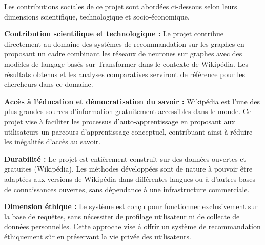 Les contributions sociales de ce projet sont abordées ci-dessous selon leurs dimensions scientifique, technologique et socio-économique.

\textbf{Contribution scientifique et technologique :}
Le projet contribue directement au domaine des systèmes de recommandation sur les graphes en proposant un cadre combinant les réseaux de neurones sur graphes avec des modèles de langage basés sur Transformer dans le contexte de Wikipédia. Les résultats obtenus et les analyses comparatives serviront de référence pour les chercheurs dans ce domaine.

\textbf{Accès à l'éducation et démocratisation du savoir :}
Wikipédia est l'une des plus grandes sources d'information gratuitement accessibles dans le monde. Ce projet vise à faciliter les processus d'auto-apprentissage en proposant aux utilisateurs un parcours d'apprentissage conceptuel, contribuant ainsi à réduire les inégalités d'accès au savoir.

\textbf{Durabilité :}
Le projet est entièrement construit sur des données ouvertes et gratuites (Wikipédia). Les méthodes développées sont de nature à pouvoir être adaptées aux versions de Wikipédia dans différentes langues ou à d'autres bases de connaissances ouvertes, sans dépendance à une infrastructure commerciale.

\textbf{Dimension éthique :}
Le système est conçu pour fonctionner exclusivement sur la base de requêtes, sans nécessiter de profilage utilisateur ni de collecte de données personnelles. Cette approche vise à offrir un système de recommandation éthiquement sûr en préservant la vie privée des utilisateurs.
